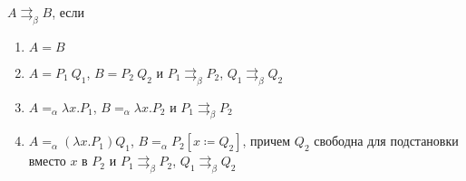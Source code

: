 \documentclass[aspectratio=169]{beamer}
\begin{document}
\newcommand{\bpar}{\rightrightarrows_{\beta}}

\begin{frame}{}
\begin{dfn}
	$A\bpar B$, если
	\begin{enumerate}
		\item $A=B$
		\item $A=P_{1}\ Q_{1}$, $B=P_{2}\ Q_{2}$ и $P_{1}\bpar P_{2}$, $Q_{1}\bpar Q_{2}$
		\item $A=_{\alpha}\lambda{}x.P_{1}$, $B=_{\alpha}\lambda{}x.P_{2}$ и 
		$P_{1}\bpar P_{2}$
		\item $A=_{\alpha}(\lambda{}x.P_1)Q_1$, $B=_{\alpha}P_2[x\coloneqq{}Q_2]$, причем $Q_2$ свободна для подстановки вместо $x$ в $P_2$ и $P_1 \bpar P_2$, $Q_1 \bpar Q_2$
	\end{enumerate}
\end{dfn}
\end{frame}
\end{document}
